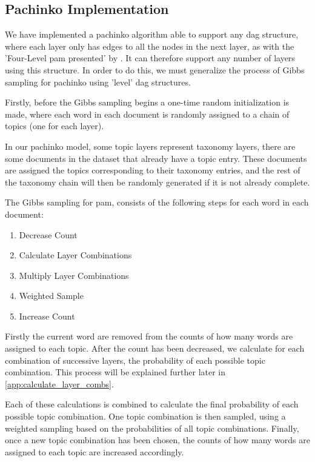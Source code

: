 \subsection{Pachinko Implementation}
We have implemented a pachinko algorithm able to support any \gls{dag} structure, where each layer only has edges to all the nodes in the next layer, as with the 'Four-Level \gls{pam} presented' by \citet{li2006pachinko}.
It can therefore support any number of layers using this structure.
In order to do this, we must generalize the process of Gibbs sampling for pachinko using 'level' \gls{dag} structures.

Firstly, before the Gibbs sampling begins a one-time random initialization is made, where each word in each document is randomly assigned to a chain of topics (one for each layer).

In our pachinko model, some topic layers represent taxonomy layers, there are some documents in the dataset that already have a topic entry.
These documents are assigned the topics corresponding to their taxonomy entries, and the rest of the taxonomy chain will then be randomly generated if it is not already complete.

The Gibbs sampling for \gls{pam}, consists of the following steps for each word in each document:

\begin{enumerate}
	\item Decrease Count
	\item Calculate Layer Combinations
	\item Multiply Layer Combinations
	\item Weighted Sample
	\item Increase Count
\end{enumerate}

Firstly the current word are removed from the counts of how many words are assigned to each topic.
After the count has been decreased, we calculate for each combination of successive layers, the probability of each possible topic combination.
This process will be explained further later in \autoref{app:calculate_layer_combs}.

Each of these calculations is combined to calculate the final probability of each possible topic combination.
One topic combination is then sampled, using a weighted sampling based on the probabilities of all topic combinations.
Finally, once a new topic combination has been chosen, the counts of how many words are assigned to each topic are increased accordingly.

